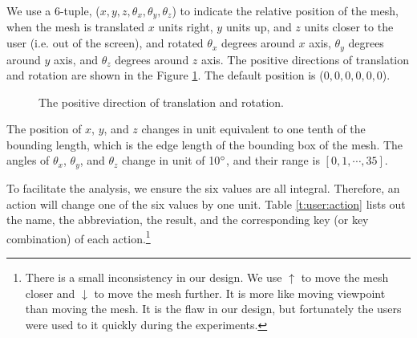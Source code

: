 We use a 6-tuple, ($x, y, z, \theta_x, \theta_y, \theta_z$) to indicate the relative position of the mesh,
when the mesh is translated $x$ units right, $y$ units up, and $z$ units closer to the user (i.e. out of the screen),
and rotated $\theta_x$ degrees around $x$ axis, $\theta_y$ degrees around $y$ axis,
and $\theta_z$ degrees around $z$ axis. 
The positive directions of translation and rotation are shown in the Figure \ref{f:user:viewpoint}.
The default position is ($0, 0, 0, 0, 0, 0$).
\begin{figure}
    \centering
    \caption{The positive direction of translation and rotation.}
    \label{f:user:viewpoint}
\end{figure}
The position of $x$, 
$y$, and $z$ changes in unit equivalent to one tenth of the bounding length, which is the edge length
of the bounding box of the mesh. The angles of $\theta_x$, $\theta_y$, and $\theta_z$ change in unit of 10$^\circ$,
and their range is $[0, 1, \cdots, 35]$.

To facilitate the analysis, we ensure the six values are all integral. 
Therefore, an action will change one of the six values by one unit.
Table \ref{t:user:action} lists out the name, the abbreviation, the result,
and the corresponding key (or key combination) of each action.\footnote{
There is a small inconsistency in our design. 
We use $\uparrow$ to move the mesh closer and $\downarrow$ to move the mesh
further. It is more like moving viewpoint than moving the mesh. 
It is the flaw in our design, but fortunately the users were used to it quickly
during the experiments.}

